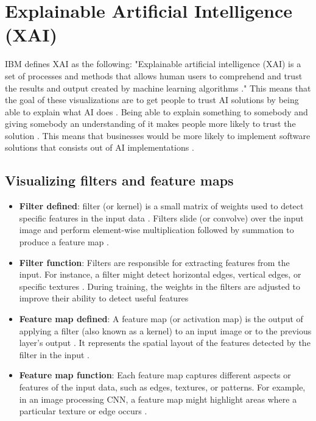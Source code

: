\documentclass[a4paper,oneside,11pt]{book}
\begin{document}
\section{Explainable Artificial Intelligence (XAI)}
IBM defines XAI as the following: "Explainable artificial intelligence (XAI) is a set of processes and methods that allows human users to comprehend and trust the results and output created by machine learning algorithms \citep{IBM_XAI}."
This means that the goal of these visualizations are to get people to trust AI solutions by being able to explain what AI does \citep{IBM_XAI}. Being able to explain something to somebody and giving somebody an understanding of it makes people more likely to trust the solution \citep{IBM_XAI}. This means that businesses would be more likely to implement software solutions that consists out of AI implementations \citep{IBM_XAI}.
\subsection{Visualizing filters and feature maps}
\begin{itemize}
    \item \textbf{Filter defined}: filter (or kernel) is a small matrix of weights used to detect specific features in the input data \citep{vestias2020featuremap}. Filters slide (or convolve) over the input image and perform element-wise multiplication followed by summation to produce a feature map \citep{vestias2020featuremap}.
    \item \textbf{Filter function}:  Filters are responsible for extracting features from the input. For instance, a filter might detect horizontal edges, vertical edges, or specific textures \citep{vestias2020featuremap}. During training, the weights in the filters are adjusted to improve their ability to detect useful features \citep{vestias2020featuremap}
    \item \textbf{Feature map defined}: A feature map (or activation map) is the output of applying a filter (also known as a kernel) to an input image or to the previous layer's output \citep{vestias2020featuremap}. It represents the spatial layout of the features detected by the filter in the input \citep{vestias2020featuremap}.
    \item \textbf{Feature map function}: Each feature map captures different aspects or features of the input data, such as edges, textures, or patterns. For example, in an image processing CNN, a feature map might highlight areas where a particular texture or edge occurs \citep{brownlee2019visualize}.
\end{itemize}
\end{document}
